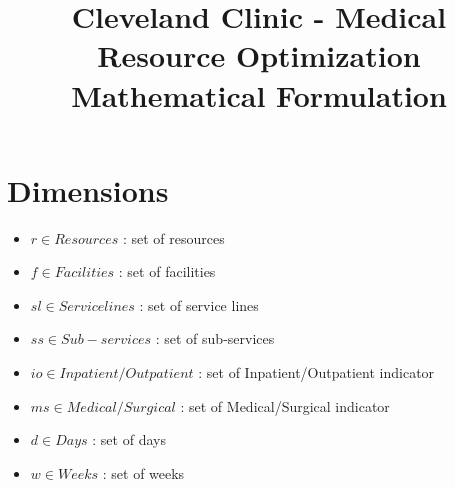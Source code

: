 \documentclass[10pt, letterpaper]{article}
\begin{document}
\title{Cleveland Clinic - Medical Resource Optimization Mathematical Formulation}
\maketitle

\section*{Dimensions}
\begin{itemize}
\item[ ] $ r \in Resources$ : set of resources
\item[ ] $ f \in Facilities$ : set of facilities
\item[ ] $ sl \in Service lines$ : set of service lines
\item[ ] $ ss \in Sub-services$ : set of sub-services
\item[ ] $ io \in Inpatient/Outpatient$ : set of Inpatient/Outpatient indicator
\item[ ] $ ms \in Medical/Surgical$ : set of Medical/Surgical indicator
\item[ ] $ d \in Days$ : set of days
\item[ ] $ w \in Weeks$ : set of weeks
\end{itemize}
\end{document}
